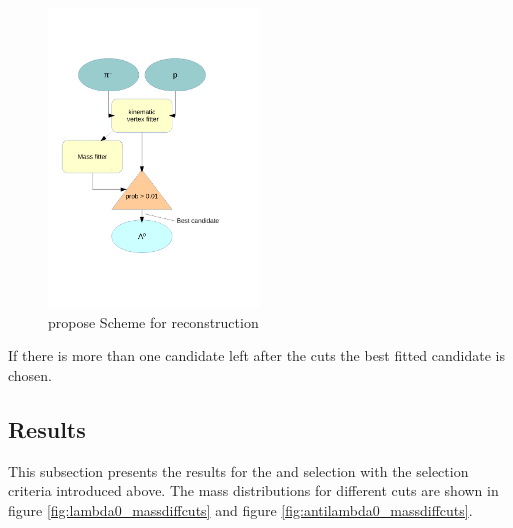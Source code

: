 		\begin{figure}
			\centering
				\includegraphics[width=0.50\textwidth]{./plots/combineLambda0.pdf}
			\caption{propose Scheme for \lam reconstruction}
			\label{fig:lambda_scheme}
		\end{figure}
		
		If there is more than one candidate left after the cuts the best fitted candidate is chosen.
		
		
	\subsection*{Results}
		This subsection presents the results for the \lam and \alam selection with the selection criteria introduced above.
		The mass distributions for different cuts are shown in figure \ref{fig:lambda0_massdiffcuts} and figure \ref{fig:antilambda0_massdiffcuts}.
	

